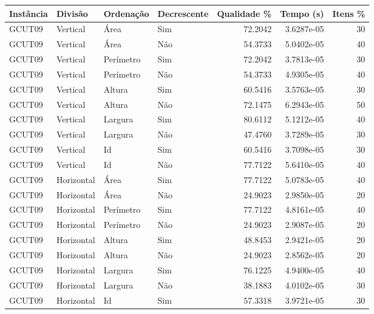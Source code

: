 \begin{tabular}{llllrrr}
\hline
Instância & Divisão     & Ordenação & Decrescente & Qualidade \% & Tempo (s)  & Itens \% \\
\hline
GCUT09    & Vertical    & Área      & Sim         & 72.2042      & 3.6287e-05 & 30       \\
GCUT09    & Vertical    & Área      & Não         & 54.3733      & 5.0402e-05 & 40       \\
GCUT09    & Vertical    & Perímetro & Sim         & 72.2042      & 3.7813e-05 & 30       \\
GCUT09    & Vertical    & Perímetro & Não         & 54.3733      & 4.9305e-05 & 40       \\
GCUT09    & Vertical    & Altura    & Sim         & 60.5416      & 3.5763e-05 & 30       \\
GCUT09    & Vertical    & Altura    & Não         & 72.1475      & 6.2943e-05 & 50       \\
GCUT09    & Vertical    & Largura   & Sim         & 80.6112      & 5.1212e-05 & 40       \\
GCUT09    & Vertical    & Largura   & Não         & 47.4760      & 3.7289e-05 & 30       \\
GCUT09    & Vertical    & Id        & Sim         & 60.5416      & 3.7098e-05 & 30       \\
GCUT09    & Vertical    & Id        & Não         & 77.7122      & 5.6410e-05 & 40       \\
GCUT09    & Horizontal  & Área      & Sim         & 77.7122      & 5.0783e-05 & 40       \\
GCUT09    & Horizontal  & Área      & Não         & 24.9023      & 2.9850e-05 & 20       \\
GCUT09    & Horizontal  & Perímetro & Sim         & 77.7122      & 4.8161e-05 & 40       \\
GCUT09    & Horizontal  & Perímetro & Não         & 24.9023      & 2.9087e-05 & 20       \\
GCUT09    & Horizontal  & Altura    & Sim         & 48.8453      & 2.9421e-05 & 20       \\
GCUT09    & Horizontal  & Altura    & Não         & 24.9023      & 2.8562e-05 & 20       \\
GCUT09    & Horizontal  & Largura   & Sim         & 76.1225      & 4.9400e-05 & 40       \\
GCUT09    & Horizontal  & Largura   & Não         & 38.1883      & 4.0102e-05 & 30       \\
GCUT09    & Horizontal  & Id        & Sim         & 57.3318      & 3.9721e-05 & 30       \\

\end{tabular}
